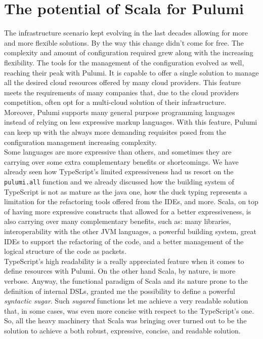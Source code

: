 \section{The potential of Scala for Pulumi}
The infrastructure scenario kept evolving in the last decades allowing for more and more flexible solutions.
By the way this change didn't come for free.
The complexity and amount of configuration required grew along with the increasing flexibility.
The tools for the management of the configuration evolved as well, reaching their peak with Pulumi.
It is capable to offer a single solution to manage all the desired cloud resources offered by many cloud providers.
This feature meets the requirements of many companies that, due to the cloud providers competition, often opt for a multi-cloud solution of their infrastructure.
Moreover, Pulumi supports many general purpose programming languages instead of relying on less expressive markup languages.
With this feature, Pulumi can keep up with the always more demanding requisites posed from the configuration management increasing complexity.\\
\newline
Some languages are more expressive than others, and sometimes they are carrying over some extra complementary benefits or shortcomings.
We have already seen how TypeScript's limited expressiveness had us resort on the \texttt{pulumi.all} function and we already discussed how the building system of TypeScript is not as mature as the java one, how the duck typing represents a limitation for the refactoring tools offered from the IDEs, and more.
Scala, on top of having more expressive constructs that allowed for a better expressiveness, is also carrying over many complementary benefits, such as: many libraries, interoperability with the other JVM languages, a powerful building system, great IDEs to support the refactoring of the code, and a better management of the logical structure of the code as packets.\\
TypeScript's high readability is a really appreciated feature when it comes to define resources with Pulumi.
On the other hand Scala, by nature, is more verbose.
Anyway, the functional paradigm of Scala and its nature prone to the definition of internal DSLs, granted me the possibility to define a powerful \textit{syntactic sugar}.
Such \textit{sugared} functions let me achieve a very readable solution that, in some cases, was even more concise with respect to the TypeScript's one.\\
So, all the heavy machinery that Scala was bringing over turned out to be the solution to achieve a both robust, expressive, concise, and readable solution.\\
